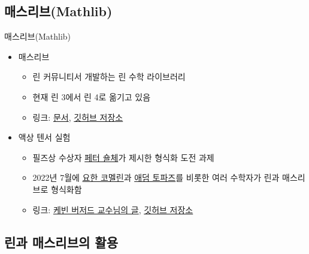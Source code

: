\documentclass{beamer}
\begin{document}
\subsection{매스리브(Mathlib)}

\begin{frame}{매스리브(Mathlib)}
  \begin{itemize}
    \item 매스리브
    \begin{itemize}
      \item 린 커뮤니티서 개발하는 린 수학 라이브러리
      \item 현재 린 3에서 린 4로 옮기고 있음
      \item 링크:
        \href{https://leanprover-community.github.io/mathlib4_docs/}{문서},
        \href{https://github.com/leanprover-community/mathlib4/}{깃허브 저장소}
    \end{itemize}
    \item 액상 텐서 실험
    \begin{itemize}
      \item 필즈상 수상자
            \href{https://people.mpim-bonn.mpg.de/scholze/}{페터 숄체}가 제시한
            형식화 도전 과제
      \item 2022년 7월에 \href{https://math.commelin.net/}{요한 코멜린}과
            \href{https://adamtopaz.com/}{애덤 토파즈}를 비롯한 여러 수학자가 린과
            매스리브로 형식화함
      \item 링크:
        \href{https://xenaproject.wordpress.com/2022/09/12/beyond-the-liquid-tensor-experiment/}{케빈 버저드 교수님의 글},
        \href{https://github.com/leanprover-community/lean-liquid}{깃허브 저장소}
    \end{itemize}
  \end{itemize}
\end{frame}

\subsection{린과 매스리브의 활용}
\end{document}
